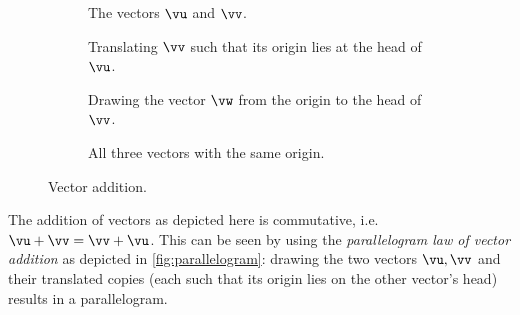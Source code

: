 \renewcommand\thesubfigure{\arabic{subfigure}}
\begin{figure}[h]
	\centering
	 \begin{subfigure}[t]{0.45\textwidth}
		\centering
		\caption{The vectors $\vu$ and $\vv$.}
	\end{subfigure}
	\hfill
	\begin{subfigure}[t]{0.45\textwidth}
		\centering
		\caption{Translating $\vv$ such that its origin lies at the head of $\vu$.}
	\end{subfigure}

	\vspace{3em}
	\begin{subfigure}[t]{0.45\textwidth}
		\centering
		\caption{Drawing the vector $\vw$ from the origin to the head of $\vv$.}
	\end{subfigure}
	\hfill
	\begin{subfigure}[t]{0.45\textwidth}
		\centering
		\caption{All three vectors with the same origin.}
	\end{subfigure}
	\caption{Vector addition.}
	\label{fig:vector addition geometric}
\end{figure}

The addition of vectors as depicted here is commutative, i.e. $\vu+\vv = \vv+\vu$. This can be seen by using the \emph{parallelogram law of vector addition} as depicted in \autoref{fig:parallelogram}: drawing the two vectors $\vu, \vv$ and their translated copies (each such that its origin lies on the other vector's head) results in a parallelogram.

